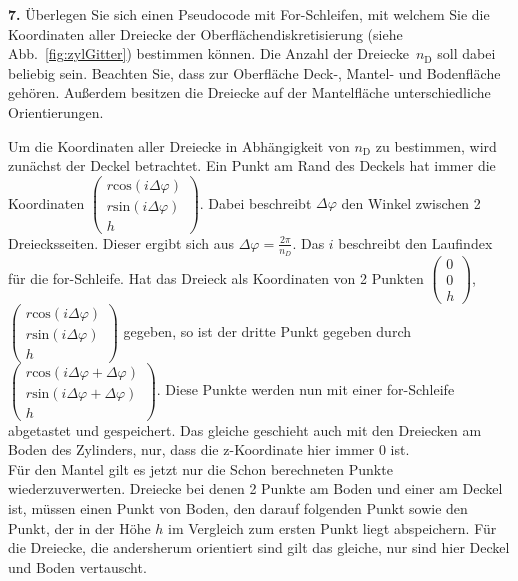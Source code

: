 \documentclass[Protokollheft.tex]{subfiles}
\begin{document}
	
	
	\begin{framed}
		\noindent \textbf{7.} Überlegen Sie sich einen Pseudocode mit For-Schleifen, mit welchem Sie die Koordinaten aller Dreiecke der Oberflächendiskretisierung (siehe Abb.~\ref{fig:zylGitter}) bestimmen können. Die Anzahl der Dreiecke~$n_\text{D}$ soll dabei beliebig sein. Beachten Sie, dass zur Oberfläche Deck-, Mantel- und Bodenfläche gehören. Außerdem besitzen die Dreiecke auf der Mantelfläche \glqq unterschiedliche Orientierungen\grqq.\label{exer:pseudocodeCylinder}
	\end{framed}
	\noindent
	Um die Koordinaten aller Dreiecke in Abhängigkeit von $n_\text{D}$ zu bestimmen, wird zunächst der Deckel betrachtet. Ein Punkt am Rand des Deckels hat immer die Koordinaten 
$	\begin{pmatrix}
		r\text{cos}(i\Delta\varphi)\\
		r\text{sin}(i\Delta\varphi)\\
		h
	\end{pmatrix}$.
	Dabei beschreibt $\Delta\varphi$ den Winkel zwischen 2 Dreiecksseiten. Dieser ergibt sich aus $\Delta\varphi=\frac{2\pi}{n_D}$. Das $i$ beschreibt den Laufindex für die for-Schleife. Hat das Dreieck als Koordinaten von 2 Punkten 
	$\begin{pmatrix}
		0\\
		0\\
		h
	\end{pmatrix}$,
	$\begin{pmatrix}
		r\text{cos}(i\Delta\varphi)\\
		r\text{sin}(i\Delta\varphi)\\
		h
	\end{pmatrix}$ gegeben, so ist der dritte Punkt gegeben durch
$	\begin{pmatrix}
		r\text{cos}(i\Delta\varphi+\Delta\varphi)\\
		r\text{sin}(i\Delta\varphi+\Delta\varphi)\\
		h
	\end{pmatrix}$.
	Diese Punkte werden nun mit einer for-Schleife abgetastet und gespeichert. Das gleiche geschieht auch mit den Dreiecken am Boden des Zylinders, nur, dass die z-Koordinate hier immer 0 ist.\\
	Für den Mantel gilt es jetzt nur die Schon berechneten Punkte wiederzuverwerten. Dreiecke bei denen 2 Punkte am Boden und einer am Deckel ist, müssen einen Punkt von Boden, den darauf folgenden Punkt sowie den Punkt, der in der Höhe $h$ im Vergleich zum ersten Punkt liegt abspeichern. Für die Dreiecke, die andersherum orientiert sind gilt das gleiche, nur sind hier Deckel und Boden vertauscht. 
	
\end{document}
